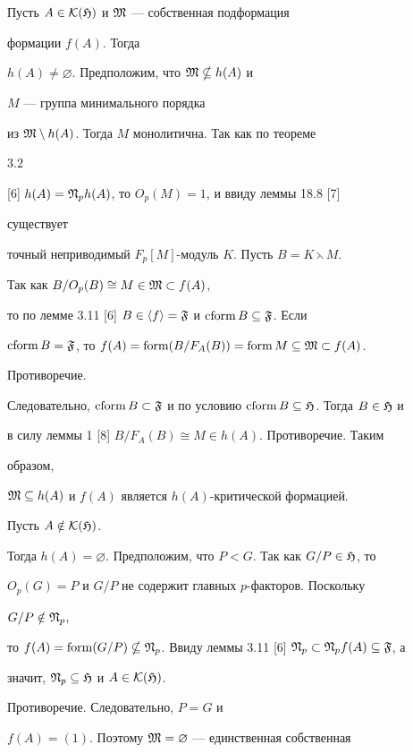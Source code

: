 \begin{pf}
Пусть $A\in\cal K(\frak H)$ и $\frak M$ --- собственная подформация 


формации $f(A)$. Тогда 


$h(A)\ne\varnothing$. Предположим, что $\frak M\nsubseteq h(A)$ и 


$M$ --- группа минимального порядка 


из $\frak M\setminus h(A)$. Тогда $M$ монолитична. Так как по теореме 


3.2 


[6] $h(A)=\frak N_p h(A)$, то $O_p(M)=1$, и ввиду леммы 18.8 [7] 


существует 


точный неприводимый $F_p[M]$-модуль $K$. Пусть $B=K\leftthreetimes M$. 


Так как $B/O_p(B)\cong M\in\frak M\subset f(A)$, 


то по лемме 3.11 [6] $B\in\la f\ra=\frak F$ и $\cform B\subseteq\frak 


F$. Если 


$\cform B=\frak F$, то $f(A)=\form(B/F_A(B))=\form M\subseteq\frak 


M\subset f(A)$. 


Противоречие. 


Следовательно, $\cform B\subset\frak F$ и по условию $\cform 


B\subseteq\frak H$. Тогда $B\in\frak H$ и 


в силу леммы 1 [8] $B/F_A(B)\cong M\in h(A)$. Противоречие. Таким 


образом, 


$\frak M\subseteq h(A)$ и $f(A)$ является $h(A)$-критической формацией. 


Пусть $A\notin\cal K(\frak H)$. 


Тогда $h(A)=\varnothing$. Предположим, что $P<G$. Так как $G/P\in\frak 


H$, то 


$O_p(G)=P$ и $G/P$ не содержит главных $p$-факторов. Поскольку 


$G/P\notin\frak N_p$, 


то $f(A)=\form(G/P)\nsubseteq\frak N_p$. Ввиду леммы 3.11 [6] $\frak 


N_p\subset\frak N_p f(A)\subseteq\frak F$, а 


значит, $\frak N_p\subseteq\frak H$ и $A\in\cal K(\frak H)$. 


Противоречие. Следовательно, $P=G$ и 


$f(A)=(1)$. Поэтому $\frak M=\varnothing$ --- единственная собственная 



\end{pf}

